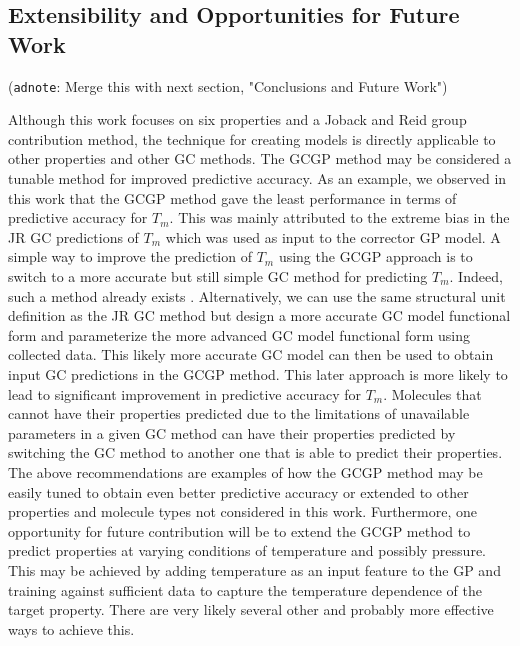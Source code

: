\documentclass[journal=jacsat,manuscript=article]{achemso}
\newcommand{\adnote}[1]{{\color{OliveGreen} (\texttt{adnote}: #1)}}
\begin{document}
\subsection{Extensibility and Opportunities for Future Work}
\adnote{Merge this with next section, "Conclusions and Future Work"}

Although this work focuses on six properties and a Joback and Reid group contribution method, the technique for creating models is directly applicable to other properties and other GC methods. 
The GCGP method may be considered a tunable method for improved predictive accuracy. As an example, we observed in this work that the GCGP method gave the least performance in terms of predictive accuracy for $T_m$. This was mainly attributed to the extreme bias in the JR GC predictions of $T_m$ which was used as input to the corrector GP model. A simple way to improve the prediction of $T_m$ using the GCGP approach is to switch to a more accurate but still simple GC method for predicting $T_m$. Indeed, such a method already exists \cite{perezponceNewGroupContribution2013}. Alternatively, we can use the same structural unit definition as the JR GC method but design a more accurate GC model functional form and parameterize the more advanced GC model functional form using collected data. This likely more accurate GC model can then be used to obtain input GC predictions in the GCGP method. This later approach is more likely to lead to significant improvement in predictive accuracy for $T_m$. Molecules that cannot have their properties predicted due to the limitations of unavailable parameters in a given GC method can have their properties predicted by switching the GC method to another one that is able to predict their properties. The above recommendations are examples of how the GCGP method may be easily tuned to obtain even better predictive accuracy or extended to other properties and molecule types not considered in this work. 
Furthermore, one opportunity for future contribution will be to extend the GCGP method to predict properties at varying conditions of temperature and possibly pressure. This may be achieved by adding temperature as an input feature to the GP and training against sufficient data to capture the temperature dependence of the target property. There are very likely several other and probably more effective ways to achieve this.
\end{document}
